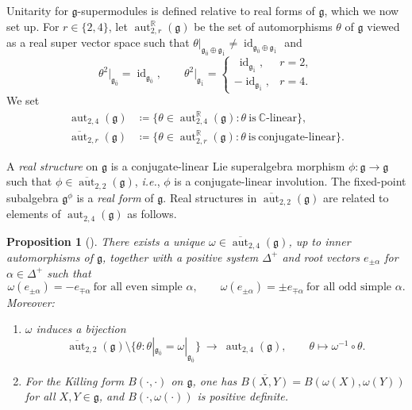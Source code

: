 \documentclass[11pt]{amsart}
\newcommand{\id}{\operatorname{id}}
\def\CC{{\mathbb C}}
\def\RR{{\mathbb R}}
\def\aut{{\operatorname{aut}}}
\def\even{{\mathfrak{g}_{\bar{0}}}}
\def\gg{{\mathfrak{g}}}
\theoremstyle{plain}
\newtheorem{proposition}[theorem]{Proposition}
\theoremstyle{remark}
\theoremstyle{definition}
\numberwithin{equation}{section}
\theoremstyle{remark}
\begin{document}
Unitarity for $\gg$-supermodules is defined relative to real forms of $\gg$, which we now set up. For $r\in\{2,4\}$, let
$\aut_{2,r}^{\RR}(\gg)$ be the set of automorphisms $\theta$ of $\gg$ viewed as a real super vector space such that
$\theta|_{\gg_{\bar 0}\oplus\gg_{\bar 1}}\neq \id_{\gg_{\bar 0}\oplus\gg_{\bar 1}}$ and
\begin{equation}
 \theta^{2}\big|_{\gg_{\bar 0}}=\id_{\gg_{\bar 0}},\qquad
 \theta^{2}\big|_{\gg_{\bar 1}}=
 \begin{cases}
 \ \id_{\gg_{\bar 1}}, & r=2,\\
 -\id_{\gg_{\bar 1}}, & r=4.
 \end{cases}
\end{equation}
We set 
\begin{equation}
 \begin{aligned}
 \aut_{2,4}(\gg) &\coloneqq \{ \theta \in \aut_{2,4}^{\RR}(\gg) : \theta \ \text{is} \ \CC\text{-linear}\}, \\ 
 \overline{\aut}_{2,r}(\gg) &\coloneqq \{ \theta \in \aut_{2,r}^{\RR}(\gg) : \theta \ \text{is} \ \text{conjugate-linear}\}.
 \end{aligned}
\end{equation}

A \emph{real structure} on $\gg$ is a conjugate-linear Lie superalgebra morphism $\phi:\gg\to\gg$ such that
$\phi\in\overline{\aut}_{2,2}(\gg)$, \emph{i.e.}, $\phi$ is a conjugate-linear involution. The fixed-point subalgebra
$\gg^{\phi}$ is a \emph{real form} of $\gg$. Real structures in $\overline{\aut}_{2,2}(\gg)$ are related to elements of $\aut_{2,4}(\gg)$ as follows.

\begin{proposition}[{\cite{Fioresi_real_forms}}]\label{prop::real_form_omega}
There exists a unique $\omega\in\overline{\aut}_{2,4}(\gg)$, up to inner automorphisms of $\gg$, together with a positive system
$\Delta^{+}$ and root vectors $e_{\pm\alpha}$ for $\alpha\in\Delta^{+}$ such that
\[
\omega(e_{\pm\alpha})=-e_{\mp\alpha}\ \text{for all even simple }\alpha,\qquad
\omega(e_{\pm\alpha})=\pm e_{\mp\alpha}\ \text{for all odd simple }\alpha.
\]
Moreover:
\begin{enumerate}
\item[a)] $\omega$ induces a bijection
\[
\overline{\aut}_{2,2}(\gg)\setminus\{\theta:\theta|_{\even}=\omega|_{\even}\}\ \longrightarrow\ \aut_{2,4}(\gg),
\qquad \theta\longmapsto \omega^{-1}\circ\theta.
\]
\item[b)] For the Killing form $B(\cdot,\cdot)$ on $\gg$, one has $\overline{B(X,Y)}=B(\omega(X),\omega(Y))$ for all $X,Y\in\gg$,
and $B(\cdot,\omega(\cdot))$ is positive definite.
\end{enumerate}
\end{proposition}
\end{document}
